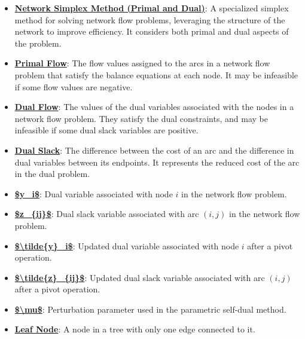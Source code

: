 \documentclass{article}%
\begin{document}
\begin{itemize}[leftmargin=*]%
\item \href{https://www.math.purdue.edu/~yipn/421/2024-11-07-NetSimplex.pdf#page=1}{\textbf{Network Simplex Method (Primal and Dual)}}: A specialized simplex method for solving network flow problems, leveraging the structure of the network to improve efficiency. It considers both primal and dual aspects of the problem.%
\item \href{https://www.math.purdue.edu/~yipn/421/2024-11-07-NetSimplex.pdf#page=2}{\textbf{Primal Flow}}: The flow values assigned to the arcs in a network flow problem that satisfy the balance equations at each node. It may be infeasible if some flow values are negative.%
\item \href{https://www.math.purdue.edu/~yipn/421/2024-11-07-NetSimplex.pdf#page=3}{\textbf{Dual Flow}}: The values of the dual variables associated with the nodes in a network flow problem. They satisfy the dual constraints, and may be infeasible if some dual slack variables are positive.%
\item \href{https://www.math.purdue.edu/~yipn/421/2024-11-07-NetSimplex.pdf#page=3}{\textbf{Dual Slack}}: The difference between the cost of an arc and the difference in dual variables between its endpoints. It represents the reduced cost of the arc in the dual problem.%
\item \href{https://www.math.purdue.edu/~yipn/421/2024-11-07-NetSimplex.pdf#page=3}{\textbf{\$y\_i\$}}: Dual variable associated with node $i$ in the network flow problem.%
\item \href{https://www.math.purdue.edu/~yipn/421/2024-11-07-NetSimplex.pdf#page=3}{\textbf{\$z\_\{ij\}\$}}: Dual slack variable associated with arc $(i,j)$ in the network flow problem.%
\item \href{https://www.math.purdue.edu/~yipn/421/2024-11-07-NetSimplex.pdf#page=14}{\textbf{\$\textbackslash{}tilde\{y\}\_i\$}}: Updated dual variable associated with node $i$ after a pivot operation.%
\item \href{https://www.math.purdue.edu/~yipn/421/2024-11-07-NetSimplex.pdf#page=14}{\textbf{\$\textbackslash{}tilde\{z\}\_\{ij\}\$}}: Updated dual slack variable associated with arc $(i,j)$ after a pivot operation.%
\item \href{https://www.math.purdue.edu/~yipn/421/2024-11-07-NetSimplex.pdf#page=45}{\textbf{\$\textbackslash{}mu\$}}: Perturbation parameter used in the parametric self-dual method.%
\item \href{https://www.math.purdue.edu/~yipn/421/2024-11-07-NetSimplex.pdf#page=2}{\textbf{Leaf Node}}: A node in a tree with only one edge connected to it.%
\end{itemize}%
\end{document}
